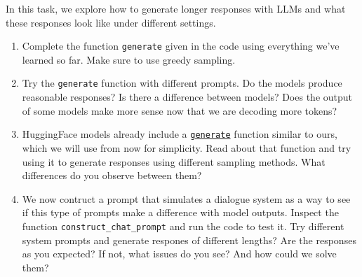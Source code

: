 \documentclass[11pt,a4paper]{article}
\begin{document}
In this task, we explore how to generate longer responses with LLMs and what
these responses look like under different settings.

\begin{enumerate}[label=(\alph*)]
    \item Complete the function \texttt{generate} given in the code using
          everything we've learned so far. Make sure to use greedy sampling.
    \item Try the \texttt{generate} function with different prompts. Do the
          models produce reasonable responses? Is there a difference between
          models? Does the output of some models make more sense now that we are
          decoding more tokens?
    \item HuggingFace models already include a
          \href{https://huggingface.co/docs/transformers/v4.51.3/en/main_classes/text_generation#transformers.GenerationMixin.generate}{\texttt{generate}}
          function similar to ours, which we will use from now for simplicity.
          Read about that function and try using it to generate responses using
          different sampling methods. What differences do you observe between
          them?
    \item We now contruct a prompt that simulates a dialogue system as a way to
          see if this type of prompts make a difference with model outputs.
          Inspect the function \texttt{construct\_chat\_prompt} and run the code
          to test it. Try different system prompts and generate respones of 
          different lengths? Are the responses as you expected? If not, what 
          issues do you see? And how could we solve them? 
\end{enumerate}
\end{document}
